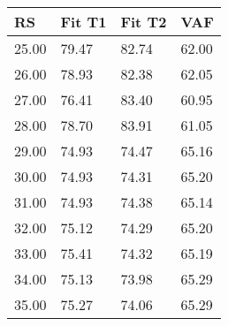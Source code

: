 \begin{tabular}{llll}
RS & Fit T1 & Fit T2 & VAF \\ 
\hline 
25.00 & 79.47 & 82.74 & 62.00 \\ 
26.00 & 78.93 & 82.38 & 62.05 \\ 
27.00 & 76.41 & 83.40 & 60.95 \\ 
28.00 & 78.70 & 83.91 & 61.05 \\ 
29.00 & 74.93 & 74.47 & 65.16 \\ 
30.00 & 74.93 & 74.31 & 65.20 \\ 
31.00 & 74.93 & 74.38 & 65.14 \\ 
32.00 & 75.12 & 74.29 & 65.20 \\ 
33.00 & 75.41 & 74.32 & 65.19 \\ 
34.00 & 75.13 & 73.98 & 65.29 \\ 
35.00 & 75.27 & 74.06 & 65.29 \\ 
\hline 
\end{tabular}